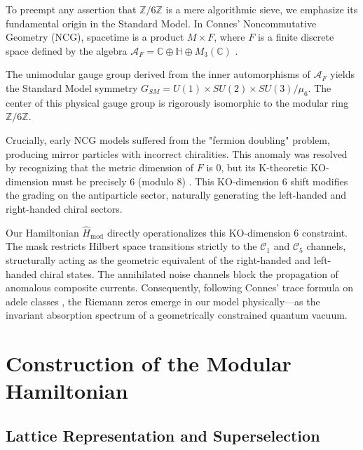 \documentclass[prl,aps,floatfix,superscriptaddress,10pt]{revtex4-2}
\newcommand{\Zmod}{\mathbb{Z}/6\mathbb{Z}}
\begin{document}
To preempt any assertion that $\Zmod$ is a mere algorithmic sieve, we emphasize its fundamental origin in the Standard Model. In Connes' Noncommutative Geometry (NCG), spacetime is a product $M \times F$, where $F$ is a finite discrete space defined by the algebra $\mathcal{A}_F = \mathbb{C} \oplus \mathbb{H} \oplus M_3(\mathbb{C})$ \cite{Connes2008}.

The unimodular gauge group derived from the inner automorphisms of $\mathcal{A}_F$ yields the Standard Model symmetry $G_{SM} = U(1) \times SU(2) \times SU(3) / \mu_6$. The center of this physical gauge group is rigorously isomorphic to the modular ring $\mathbb{Z}/6\mathbb{Z}$. 

Crucially, early NCG models suffered from the "fermion doubling" problem, producing mirror particles with incorrect chiralities. This anomaly was resolved by recognizing that the metric dimension of $F$ is 0, but its K-theoretic KO-dimension must be precisely 6 (modulo 8) \cite{Chamseddine2007}. This KO-dimension 6 shift modifies the grading on the antiparticle sector, naturally generating the left-handed and right-handed chiral sectors. 

Our Hamiltonian $\hat{H}_{\text{mod}}$ directly operationalizes this KO-dimension 6 constraint. The mask restricts Hilbert space transitions strictly to the $\mathcal{C}_1$ and $\mathcal{C}_5$ channels, structurally acting as the geometric equivalent of the right-handed and left-handed chiral states. The annihilated noise channels block the propagation of anomalous composite currents. Consequently, following Connes' trace formula on adele classes \cite{Connes1999}, the Riemann zeros emerge in our model physically—as the invariant absorption spectrum of a geometrically constrained quantum vacuum.

\section{Construction of the Modular Hamiltonian}

\subsection{Lattice Representation and Superselection}
\end{document}
